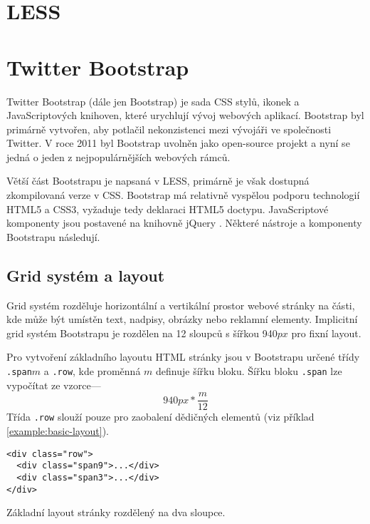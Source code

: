 \section{LESS}
\label{sec:less}

\section{Twitter Bootstrap}
\label{sec:bootsrap}

Twitter Bootstrap (dále jen Bootstrap) je sada CSS stylů, ikonek a JavaScriptových knihoven, které urychlují vývoj webových aplikací. Bootstrap byl primárně vytvořen, aby potlačil nekonzistenci mezi vývojáři ve společnosti Twitter. V roce 2011 byl Bootstrap uvolněn jako open-source projekt a nyní se jedná o jeden z nejpopulárnějších webových rámců.

Větší část Bootstrapu je napsaná v LESS, primárně je však dostupná zkompilovaná verze v CSS. Bootstrap má relativně vyspělou podporu technologií HTML5 a CSS3, vyžaduje tedy deklaraci HTML5 doctypu. JavaScriptové komponenty jsou postavené na knihovně jQuery \footnotemark[1]. Některé nástroje a komponenty Bootstrapu následují.


\subsection{Grid systém a layout}

Grid systém rozděluje horizontální a vertikální prostor webové stránky na části, kde může být umístěn text, nadpisy, obrázky nebo reklamní elementy. Implicitní grid systém Bootstrapu je rozdělen na 12 sloupců s šířkou 940$px$ pro fixní layout.

Pro vytvoření základního layoutu HTML stránky jsou v Bootstrapu určené třídy \texttt{.span}$m$ a \texttt{.row}, kde proměnná $m$ definuje šířku bloku. Šířku bloku \texttt{.span} lze vypočítat ze vzorce---
$$940px * \frac{m}{12}$$
Třída \texttt{.row} slouží pouze pro zaobalení dědičných elementů (viz příklad \ref{example:basic-layout}).

\begin{example}
    \centering
    \begin{lstlisting}
<div class="row">
  <div class="span9">...</div>
  <div class="span3">...</div>
</div>
    \end{lstlisting}
    \caption{Základní layout stránky rozdělený na dva sloupce.}
    \label{example:basic-layout}
\end{example}

